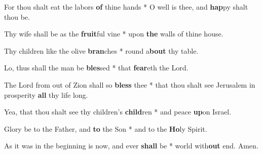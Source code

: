 \begin{multicols}{2}
	For thou shalt eat the labors \textbf{of} thine hands * O well is thee, and \textbf{hap}py shalt thou be.
	
	Thy wife shall be as the \textbf{fruit}ful vine * upon \textbf{the} walls of thine house.
	
	Thy children like the olive \textbf{bran}ches * round a\textbf{bout} thy table.
	
	Lo, thus shall the man be \textbf{bles}sed * that \textbf{fear}eth the Lord.
	
	The Lord from out of Zion shall so \textbf{bless} thee * that thou shalt see Jerusalem in prosperity \textbf{all} thy life long.
	
	Yea, that thou shalt see thy children's \textbf{child}ren * and peace \textbf{up}on Israel.
	
	Glory be to the Father, and \textbf{to} the Son * and to the \textbf{Ho}ly Spirit.
	
	As it was in the beginning is now, and ever \textbf{shall} be * world with\textbf{out} end. Amen.
\end{multicols}